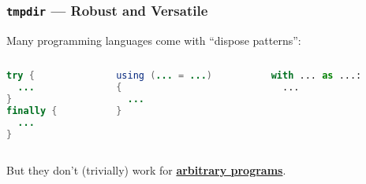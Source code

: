 \begin{frame}[fragile]

\frametitle{\texttt{tmpdir} --- Robust and Versatile}

\begin{center}

Many programming languages come with ``dispose patterns'':

\end{center}

\begin{columns}

\begin{column}{0.3\textwidth}

\begin{lstlisting}[language=java]
try {
  ...
}
finally {
  ...
}
\end{lstlisting}

\end{column}

\begin{column}{0.3\textwidth}

\begin{lstlisting}[language=java]
using (... = ...)
{
  ...
}
\end{lstlisting}

\end{column}

\begin{column}{0.3\textwidth}

\begin{lstlisting}[language=python]
with ... as ...:
  ...
\end{lstlisting}

\end{column}

\end{columns}

\begin{center}

But they don't (trivially) work for \underline{\textbf{arbitrary programs}}.

\end{center}

\end{frame}

